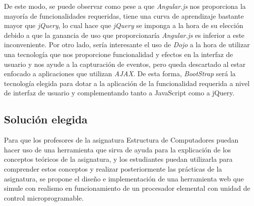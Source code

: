 \begin{table}[htbp]
\centering
\caption{Comparación de frameworks y bibliotecas.}
\label{tab:comparison_webframeworks}
\end{table}

De este modo, se puede observar como pese a que \textit{Angular.js} nos proporciona la mayoría de funcionalidades requeridas, tiene una curva de aprendizaje bastante mayor que \textit{jQuery}, lo cual hace que \textit{jQuery} se imponga a la hora de su elección debido a que la ganancia de uso que proporcionaría \textit{Angular.js} es inferior a este inconveniente. Por otro lado, sería interesante el uso de \textit{Dojo} a la hora de utilizar una tecnología que nos proporcione funcionalidad y efectos en la interfaz de usuario y nos ayude a la capturación de eventos, pero queda descartado al estar enfocado a aplicaciones que utilizan \textit{AJAX}. De esta forma, \textit{BootStrap} será la tecnología elegida para dotar a la aplicación de la funcionalidad requerida a nivel de interfaz de usuario y complementando tanto a JavaScript como a jQuery.

\subsection{Solución elegida}
\label{sec:solution_selection}

Para que los profesores de la asignatura Estructura de Computadores puedan hacer uso de una herramienta que sirva de ayuda para la explicación de los conceptos teóricos de la asignatura, y los estudiantes puedan utilizarla para comprender estos conceptos y realizar posteriormente las prácticas de la asignatura, se propone el diseño e implementación de una herramienta web que simule con realismo en funcionamiento de un procesador elemental con unidad de control microprogramable.

